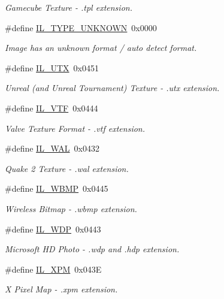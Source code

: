 \begin{DoxyCompactItemize}
\begin{DoxyCompactList}\small\item\em Gamecube Texture -\/ .tpl extension. \end{DoxyCompactList}\item 
\#define \hyperlink{group__il__formats_gaaa63b35fc64974db80d097674199140c}{I\+L\+\_\+\+T\+Y\+P\+E\+\_\+\+U\+N\+K\+N\+O\+W\+N}~0x0000
\begin{DoxyCompactList}\small\item\em Image has an unknown format / auto detect format. \end{DoxyCompactList}\item 
\#define \hyperlink{group__il__formats_ga774991afc70494f28b5c7f494ffe1fbb}{I\+L\+\_\+\+U\+T\+X}~0x0451
\begin{DoxyCompactList}\small\item\em Unreal (and Unreal Tournament) Texture -\/ .utx extension. \end{DoxyCompactList}\item 
\#define \hyperlink{group__il__formats_gac78df8193efc63314efa495217a36d63}{I\+L\+\_\+\+V\+T\+F}~0x0444
\begin{DoxyCompactList}\small\item\em Valve Texture Format -\/ .vtf extension. \end{DoxyCompactList}\item 
\#define \hyperlink{group__il__formats_gab1e8eb9dd24155726d1469e1eae756dc}{I\+L\+\_\+\+W\+A\+L}~0x0432
\begin{DoxyCompactList}\small\item\em Quake 2 Texture -\/ .wal extension. \end{DoxyCompactList}\item 
\#define \hyperlink{group__il__formats_gacabbc0ef52f005e4890c683a70c38cd6}{I\+L\+\_\+\+W\+B\+M\+P}~0x0445
\begin{DoxyCompactList}\small\item\em Wireless Bitmap -\/ .wbmp extension. \end{DoxyCompactList}\item 
\#define \hyperlink{group__il__formats_gaf17515a28c935dc8c01ed6f98a5d7ea5}{I\+L\+\_\+\+W\+D\+P}~0x0443
\begin{DoxyCompactList}\small\item\em Microsoft H\+D Photo -\/ .wdp and .hdp extension. \end{DoxyCompactList}\item 
\#define \hyperlink{group__il__formats_ga3f15f93b91a09441f3e7352ade9c6b46}{I\+L\+\_\+\+X\+P\+M}~0x043\+E
\begin{DoxyCompactList}\small\item\em X Pixel Map -\/ .xpm extension. \end{DoxyCompactList}\end{DoxyCompactItemize}


